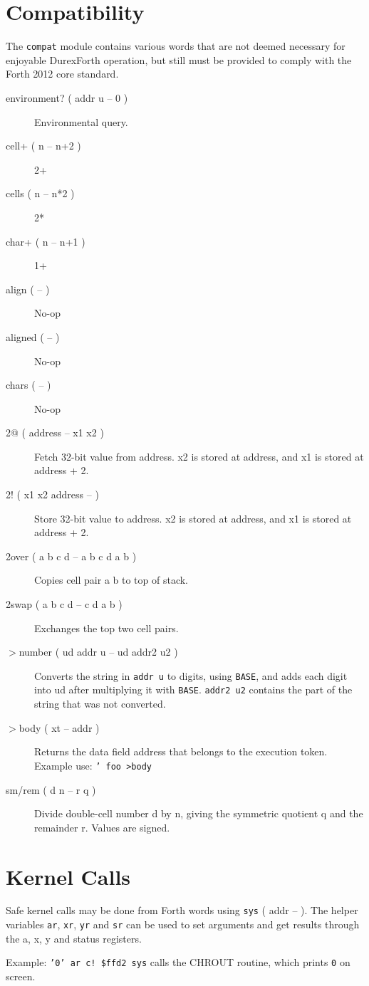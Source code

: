 \section{Compatibility}

The \texttt{compat} module contains various words that are not deemed necessary for enjoyable DurexForth operation, but still must be provided to comply with the Forth 2012 core standard.

\begin{description}
    \item[environment? ( addr u -- 0 )] Environmental query.
    \item[cell+ ( n -- n+2 )] 2+
    \item[cells ( n -- n*2 )] 2*
    \item[char+ ( n -- n+1 )] 1+
    \item[align ( -- )] No-op
    \item[aligned ( -- )] No-op
    \item[chars ( -- )] No-op
    \item[2@ ( address -- x1 x2 )] Fetch 32-bit value from address. x2 is stored at address, and x1 is stored at address + 2.
    \item[2! ( x1 x2 address -- )] Store 32-bit value to address. x2 is stored at address, and x1 is stored at address + 2.
    \item[2over ( a b c d -- a b c d a b )] Copies cell pair a b to top of stack.
    \item[2swap ( a b c d -- c d a b )] Exchanges the top two cell pairs.
    \item[$>$number ( ud addr u -- ud addr2 u2 )] Converts the string in \texttt{addr u} to digits, using \texttt{BASE}, and adds each digit into ud after multiplying it with \texttt{BASE}. \texttt{addr2 u2} contains the part of the string that was not converted.
    \item[$>$body ( xt -- addr )] Returns the data field address that belongs to the execution token. Example use: \texttt{' foo >body}
    \item[sm/rem ( d n -- r q )] Divide double-cell number d by n, giving the symmetric quotient q and the remainder r. Values are signed.

\end{description}

\section{Kernel Calls}

Safe kernel calls may be done from Forth words using \texttt{sys} ( addr -- ). The helper variables \texttt{ar}, \texttt{xr}, \texttt{yr} and \texttt{sr} can be used to set arguments and get results through the a, x, y and status registers.

Example: \texttt{'0' ar c! \$ffd2 sys} calls the CHROUT routine, which prints \texttt{0} on screen.
